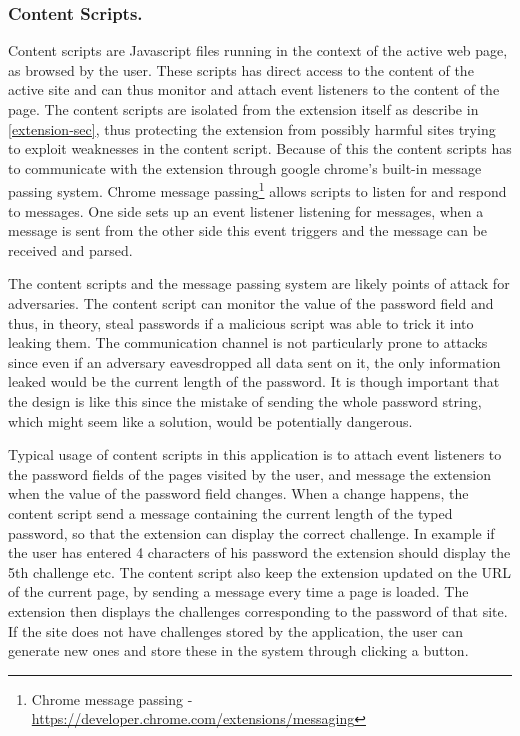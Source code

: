 \subsubsection{Content Scripts.}\label{cs}
Content scripts are Javascript files running in the context of the active web page, as browsed by the user. These scripts has direct access to the content of the active site and can thus monitor and attach event listeners to the content of the page. The content scripts are isolated from the extension itself as describe in \autoref{extension-sec}, thus protecting the extension from possibly harmful sites trying to exploit weaknesses in the content script. Because of this the content scripts has to communicate with the extension through google chrome's built-in message passing system. Chrome message passing\footnote{Chrome message passing - \url{https://developer.chrome.com/extensions/messaging}} allows scripts to listen for and respond to messages. One side sets up an event listener listening for messages, when a message is sent from the other side this event triggers and the message can be received and parsed. 
\par The content scripts and the message passing system are likely points of attack for adversaries. The content script can monitor the value of the password field and thus, in theory, steal passwords if a malicious script was able to trick it into leaking them. The communication channel is not particularly prone to attacks since even if an adversary eavesdropped all data sent on it, the only information leaked would be the current length of the password. It is though important that the design is like this since the mistake of sending the whole password string, which might seem like a solution, would be potentially dangerous. 
\par Typical usage of content scripts in this application is to attach event listeners to the password fields of the pages visited by the user, and message the extension when the value of the password field changes. When a change happens, the content script send a message containing the current length of the typed password, so that the extension can display the correct challenge. In example if the user has entered 4 characters of his password the extension should display the 5th challenge etc. The content script also keep the extension updated on the URL of the current page, by sending a message every time a page is loaded. The extension then displays the challenges corresponding to the password of that site. If the site does not have challenges stored by the application, the user can generate new ones and store these in the system through clicking a button.  

